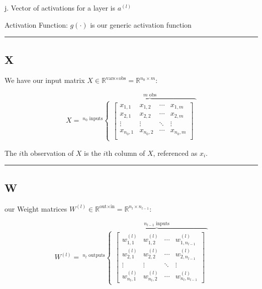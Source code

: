\documentclass[
]{book}
\begin{document}
j\). Vector of activations for a layer is \(a^{(l)}\)

Activation Function: \(g(\cdot)\) is our generic activation function

\begin{center}\rule{0.5\linewidth}{0.5pt}\end{center}

\hypertarget{x}{%
\subsection{X}\label{x}}

We have our input matrix \(X \in \mathbb{R}^{\text{vars} \times \text{obs}} = \mathbb{R}^{n_0 \times m}\):

\[
X = \ ^{n_0 \text{ inputs}}
\overbrace{
  \begin{cases}
    \begin{bmatrix}
    x_{1, 1} & x_{1, 2} & \cdots & x_{1, m} \\
    x_{2, 1} & x_{2, 2} & \cdots & x_{2, m} \\
    \vdots & \vdots & \ddots & \vdots \\
    x_{n_0, 1} & x_{n_0, 2} & \cdots & x_{n_0, m} \\
    \end{bmatrix}
  \end{cases} 
}^{m \text{ obs}}
\]

The \(i\)th observation of \(X\) is the \(i\)th column of \(X\), referenced as \(x_i\).

\begin{center}\rule{0.5\linewidth}{0.5pt}\end{center}

\hypertarget{w-1}{%
\subsection{W}\label{w-1}}

our Weight matrices \(W^{(l)} \in \mathbb{R}^{\text{out} \times \text{in}} = \mathbb{R}^{n_l \times n_{l - 1}}\):

\[
W^{(l)} = \ ^{n_l\text{ outputs}}
\overbrace{
  \begin{cases}
    \begin{bmatrix}
    w^{(l)}_{1, 1} & w^{(l)}_{1, 2} & \cdots & w^{(l)}_{1, n_{l-1}} \\
    w^{(l)}_{2, 1} & w^{(l)}_{2, 2} & \cdots & w^{(l)}_{2, n_{l-1}} \\
    \vdots & \vdots & \ddots & \vdots \\
    w^{(l)}_{n_l, 1} & w^{(l)}_{n_l, 2} & \cdots & w^{(l)}_{n_l, n_{l-1}}
    \end{bmatrix}
  \end{cases} 
}^{n_{l - 1} \text{ inputs}}
\]
\end{document}
